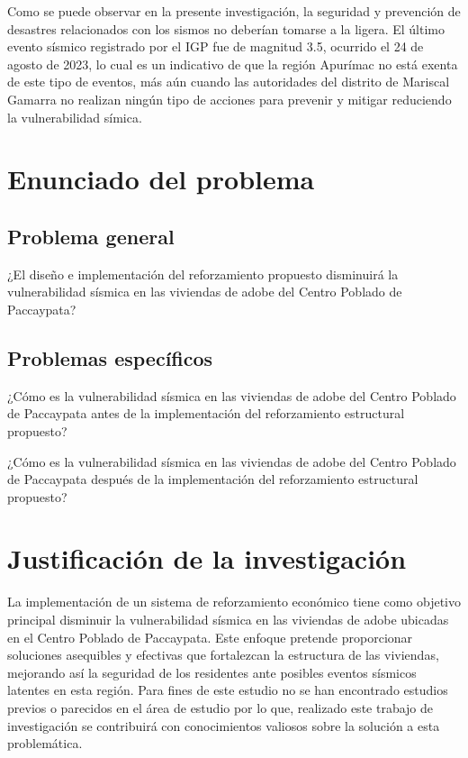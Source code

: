 Como se puede observar en la presente investigación, la seguridad y prevención de desastres relacionados con los sismos no deberían tomarse a la ligera. El último evento sísmico registrado por el \ac{IGP} fue de magnitud 3.5, ocurrido el 24 de agosto de 2023, lo cual es un indicativo de que la región Apurímac no está exenta de este tipo de eventos, más aún cuando las autoridades del distrito de Mariscal Gamarra no realizan ningún tipo de acciones para prevenir y mitigar reduciendo la vulnerabilidad símica.

\section{Enunciado del problema}
\subsection{Problema general}
¿El diseño e implementación del reforzamiento propuesto disminuirá la vulnerabilidad sísmica en las viviendas de adobe del Centro Poblado de Paccaypata?
\subsection{Problemas específicos}
¿Cómo es la vulnerabilidad sísmica en las viviendas de adobe del Centro Poblado de Paccaypata antes de la implementación del reforzamiento estructural propuesto?

¿Cómo es la vulnerabilidad sísmica en las viviendas de adobe del Centro Poblado de Paccaypata después de la implementación del reforzamiento estructural propuesto?

\section{Justificación de la investigación} 

La implementación de un sistema de reforzamiento económico tiene como objetivo principal disminuir la vulnerabilidad sísmica en las viviendas de adobe ubicadas en el Centro Poblado de Paccaypata. Este enfoque pretende proporcionar soluciones asequibles y efectivas que fortalezcan la estructura de las viviendas, mejorando así la seguridad de los residentes ante posibles eventos sísmicos latentes en esta región. Para fines de este estudio no se han encontrado estudios previos o parecidos en el área de estudio por lo que, realizado este trabajo de investigación se contribuirá con conocimientos valiosos sobre la solución a esta problemática.


